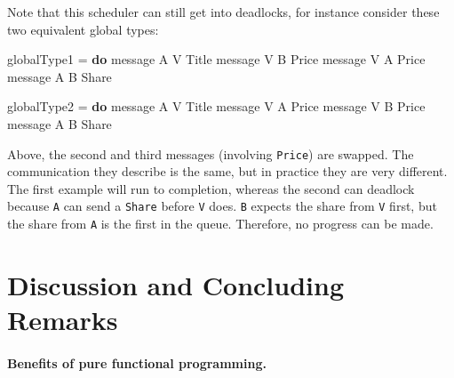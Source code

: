 \documentclass[runningheads,plain]{llncs}
\newenvironment{Shaded}{}{}
\newcommand{\KeywordTok}[1]{\textcolor[rgb]{0.00,0.44,0.13}{\textbf{#1}}}
\newcommand{\DataTypeTok}[1]{\textcolor[rgb]{0.56,0.13,0.00}{#1}}
\newcommand{\FunctionTok}[1]{\textcolor[rgb]{0.02,0.16,0.49}{#1}}
\newcommand{\NormalTok}[1]{#1}
\begin{document}
Note that this scheduler can still get into deadlocks, for instance
consider these two equivalent global types:

\begin{Shaded}
\begin{Highlighting}[]
\NormalTok{globalType1 }\FunctionTok{=} \KeywordTok{do}
\NormalTok{    message }\DataTypeTok{A} \DataTypeTok{V} \DataTypeTok{Title}
\NormalTok{    message }\DataTypeTok{V} \DataTypeTok{B} \DataTypeTok{Price}
\NormalTok{    message }\DataTypeTok{V} \DataTypeTok{A} \DataTypeTok{Price}
\NormalTok{    message }\DataTypeTok{A} \DataTypeTok{B} \DataTypeTok{Share}

\NormalTok{globalType2 }\FunctionTok{=} \KeywordTok{do}
\NormalTok{    message }\DataTypeTok{A} \DataTypeTok{V} \DataTypeTok{Title}
\NormalTok{    message }\DataTypeTok{V} \DataTypeTok{A} \DataTypeTok{Price}
\NormalTok{    message }\DataTypeTok{V} \DataTypeTok{B} \DataTypeTok{Price}
\NormalTok{    message }\DataTypeTok{A} \DataTypeTok{B} \DataTypeTok{Share}
\end{Highlighting}
\end{Shaded}
\noindent
Above, the second and third messages (involving \texttt{\DataTypeTok{Price}}) are swapped. The communication they describe
is the same, but in practice they are very different. The first example will
run to completion, whereas the second can deadlock because \texttt{A} can
send a \texttt{Share} before \texttt{V} does. \texttt{B} expects the
share from \texttt{V} first, but the share from \texttt{A} is the first
in the queue. Therefore, no progress can be made.


\section{Discussion and Concluding Remarks}\label{discussion}

\paragraph{Benefits of pure functional
programming.}\label{benefits-of-pure-functional-programming}
\end{document}
